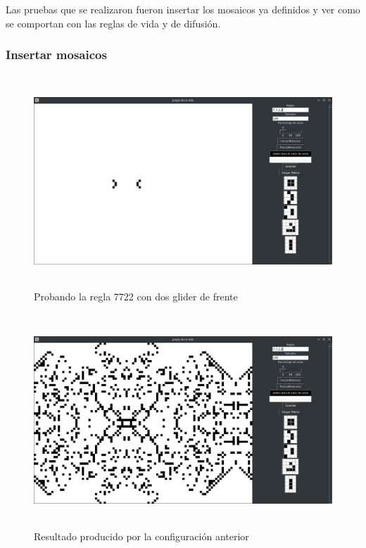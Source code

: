 Las pruebas que se realizaron fueron insertar los mosaicos ya definidos y ver como se comportan con las reglas de vida y de difusión.

\subsubsection{Insertar mosaicos}
\begin{figure}[H]
\begin{center}
 \includegraphics[width=12cm, height=8cm]{./img/inicio.png}
 \caption{Probando la regla 7722 con dos glider de frente}
 \label{fig:inicio}
\end{center}
\end{figure}

\begin{figure}[H]
\begin{center}
 \includegraphics[width=12cm, height=8cm]{./img/final.png}
 \caption{Resultado producido por la configuración anterior}
 \label{fig:final}
\end{center}
\end{figure}


